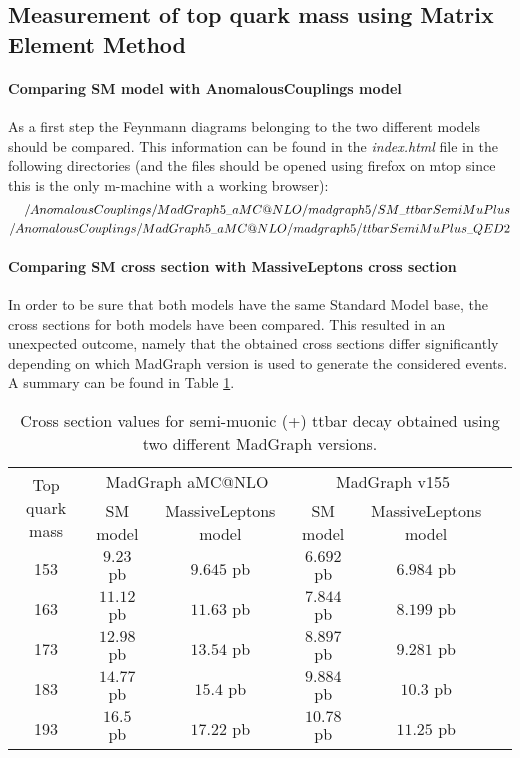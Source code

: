 \subsection{Measurement of top quark mass using Matrix Element Method}

\paragraph{Comparing SM model with AnomalousCouplings model\\}
As a first step the Feynmann diagrams belonging to the two different models should be compared. This information can be found in the \textit{index.html} file in the following directories (and the files should be opened using firefox on mtop since this is the only m-machine with a working browser):
\begin{eqnarray*}
 \tiny{/AnomalousCouplings/MadGraph5\_aMC@NLO/madgraph5/SM\_ttbarSemiMuPlus} \\
 \tiny{/AnomalousCouplings/MadGraph5\_aMC@NLO/madgraph5/ttbarSemiMuPlus\_QED2}
\end{eqnarray*}

\paragraph{Comparing SM cross section with MassiveLeptons cross section\\}
In order to be sure that both models have the same Standard Model base, the cross sections for both models have been compared. This resulted in an unexpected outcome, namely that the obtained cross sections differ significantly depending on which MadGraph version is used to generate the considered events. A summary can be found in Table \ref{table::MGXS}.
\begin{table}[h!]
 \centering
 \begin{tabular}{|c|c|c|c|c|c|}
  \hline
  \multirow{2}{*}{Top quark mass}	&  \multicolumn{2}{|c|}{MadGraph aMC@NLO}	& \multicolumn{2}{|c|}{MadGraph v155}  	\\
					&  SM model	& MassiveLeptons model		& SM model 	& MassiveLeptons model	\\
  \hline
    153 				& $9.23$ pb	& $9.645$ pb			& $6.692$ pb	& $6.984$ pb		\\
    163					& $11.12$ pb	& $11.63$ pb			& $7.844$ pb	& $8.199$ pb		\\
    173					& $12.98$ pb	& $13.54$ pb			& $8.897$ pb	& $9.281$ pb		\\
    183					& $14.77$ pb	& $15.4$ pb			& $9.884$ pb	& $10.3$ pb		\\
    193					& $16.5$ pb	& $17.22$ pb			& $10.78$ pb	& $11.25$ pb		\\
  \hline 
 \end{tabular} 
 \caption{Cross section values for semi-muonic (+) ttbar decay obtained using two different MadGraph versions.} \label{table::MGXS}
\end{table}

